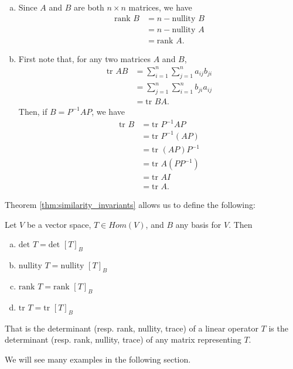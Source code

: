 \documentclass[12pt,letterpaper,reqno]{article}
\numberwithin{equation}{section}
\begin{document}
\begin{pf}
\begin{enumerate}[(a)]
	\item Since $A$ and $B$ are both $n \times n$ matrices, we have 
	\begin{align*}
		\text{rank }B &=n-\text{nullity }B \\
		&=n-\text{nullity }A \\
		&=\text{rank }A.
	\end{align*}
	\item First note that, for any two matrices $A$ and $B$, 
	\begin{align*}
		\text{tr }AB &= \sum_{i=1}^n\sum_{j=1}^n a_{ij}b_{ji} \\
		&= \sum_{j=1}^n\sum_{i=1}^n b_{ji}a_{ij} \\
		&=\text{tr }BA.
	\end{align*}
	Then, if $B=P^{-1}AP$, we have
	\begin{align*}
		\text{tr }B&=\text{tr }P^{-1}AP \\
		&=\text{tr }P^{-1}(AP) \\
		&=\text{tr }(AP)P^{-1} \\
		&=\text{tr }A(PP^{-1}) \\
		&=\text{tr }AI \\
		&=\text{tr }A.
	\end{align*} 
	\end{enumerate}
	
\end{pf}
Theorem \ref{thm:similarity_invariants} allows us to define the following:
\begin{defn}
	Let $V$ be a vector space, $T \in Hom(V)$, and $B$ any basis for $V$. Then 
\begin{enumerate}[(a)]
	\item $\text{det }T=\text{det }[T]_B$
	\item $\text{nullity }T=\text{nullity }[T]_B$
	\item $\text{rank }T=\text{rank }[T]_B$
	\item $\text{tr }T=\text{tr }[T]_B$
\end{enumerate}
That is the determinant (resp. rank, nullity, trace) of a linear operator $T$ is the determinant (resp. rank, nullity, trace) of any matrix representing $T$.
\end{defn}

We will see many examples in the following section.
\end{document}
